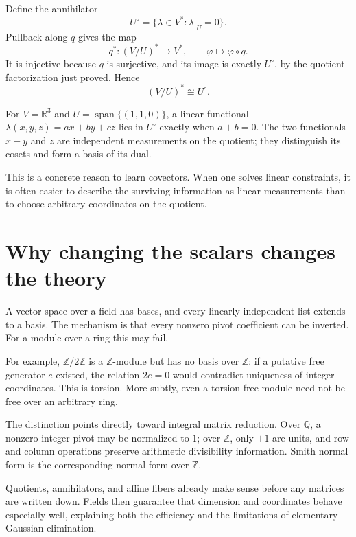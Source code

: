 Define the annihilator
\[
 U^\circ=\{\lambda\in V^*:\lambda|_U=0\}.
\]
Pullback along \(q\) gives the map
\[
 q^*:(V/U)^*\longrightarrow V^*,\qquad \varphi\longmapsto\varphi\circ q.
\]
It is injective because \(q\) is surjective, and its image is exactly \(U^\circ\), by the quotient factorization just proved. Hence
\[
 \boxed{(V/U)^*\cong U^\circ.}
\]

For \(V=\mathbb R^3\) and \(U=\operatorname{span}\{(1,1,0)\}\), a linear functional
\(\lambda(x,y,z)=ax+by+cz\) lies in \(U^\circ\) exactly when \(a+b=0\). The two functionals \(x-y\) and \(z\) are independent measurements on the quotient; they distinguish its cosets and form a basis of its dual.

This is a concrete reason to learn covectors. When one solves linear constraints, it is often easier to describe the surviving information as linear measurements than to choose arbitrary coordinates on the quotient.

\section{Why changing the scalars changes the theory}

A vector space over a field has bases, and every linearly independent list extends to a basis. The mechanism is that every nonzero pivot coefficient can be inverted. For a module over a ring this may fail.

For example, \(\mathbb Z/2\mathbb Z\) is a \(\mathbb Z\)-module but has no basis over \(\mathbb Z\): if a putative free generator \(e\) existed, the relation \(2e=0\) would contradict uniqueness of integer coordinates. This is torsion. More subtly, even a torsion-free module need not be free over an arbitrary ring.

The distinction points directly toward integral matrix reduction. Over \(\mathbb Q\), a nonzero integer pivot may be normalized to \(1\); over \(\mathbb Z\), only \(\pm1\) are units, and row and column operations preserve arithmetic divisibility information. Smith normal form is the corresponding normal form over \(\mathbb Z\).

Quotients, annihilators, and affine fibers already make sense before any matrices are written down. Fields then guarantee that dimension and coordinates behave especially well, explaining both the efficiency and the limitations of elementary Gaussian elimination.
